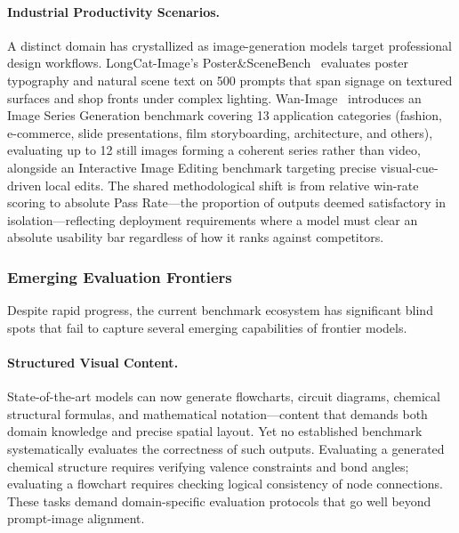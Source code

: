 \paragraph{Industrial Productivity Scenarios.} A distinct domain has crystallized as image-generation models target professional design workflows. LongCat-Image's Poster\&SceneBench~\citep{team2025longcat} evaluates poster typography and natural scene text on 500 prompts that span signage on textured surfaces and shop fronts under complex lighting. Wan-Image~\citep{mao2026wan} introduces an Image Series Generation benchmark covering 13 application categories (fashion, e-commerce, slide presentations, film storyboarding, architecture, and others), evaluating up to 12 still images forming a coherent series rather than video, alongside an Interactive Image Editing benchmark targeting precise visual-cue-driven local edits. The shared methodological shift is from relative win-rate scoring to absolute Pass Rate---the proportion of outputs deemed satisfactory in isolation---reflecting deployment requirements where a model must clear an absolute usability bar regardless of how it ranks against competitors.


\subsubsection{Emerging Evaluation Frontiers}
\label{subsubsec:emerging_eval}

Despite rapid progress, the current benchmark ecosystem has significant blind spots that fail to capture several emerging capabilities of frontier models.

\paragraph{Structured Visual Content.} State-of-the-art models can now generate flowcharts, circuit diagrams, chemical structural formulas, and mathematical notation---content that demands both domain knowledge and precise spatial layout. Yet no established benchmark systematically evaluates the correctness of such outputs. Evaluating a generated chemical structure requires verifying valence constraints and bond angles; evaluating a flowchart requires checking logical consistency of node connections. These tasks demand domain-specific evaluation protocols that go well beyond prompt-image alignment.


